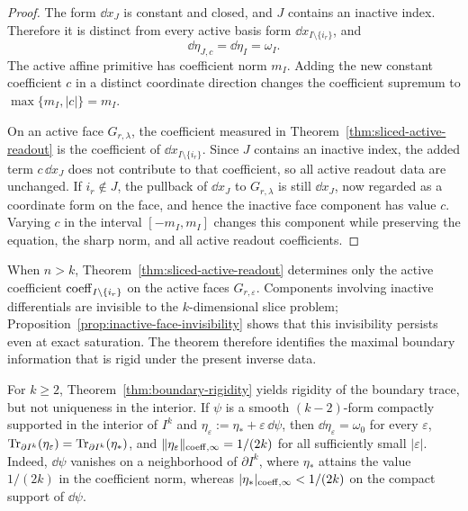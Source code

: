 \begin{proof}
The form $\dd x_J$ is constant and closed, and $J$ contains an inactive index.
Therefore it is distinct from every active basis form
$\dd x_{I\setminus\{i_r\}}$, and
\[
\dd\eta_{J,c}=\dd\eta_I=\omega_I .
\]
The active affine primitive has coefficient norm $m_I$. Adding the new constant
coefficient $c$ in a distinct coordinate direction changes the coefficient
supremum to $\max\{m_I,|c|\}=m_I$.

On an active face $G_{r,\lambda}$, the coefficient measured in
Theorem~\ref{thm:sliced-active-readout} is the coefficient of
$\dd x_{I\setminus\{i_r\}}$. Since $J$ contains an inactive index, the added
term $c\,\dd x_J$ does not contribute to that coefficient, so all active
readout data are unchanged. If $i_r\notin J$, the pullback of $\dd x_J$ to
$G_{r,\lambda}$ is still $\dd x_J$, now regarded as a coordinate form on the
face, and hence the inactive face component has value $c$. Varying $c$ in the
interval $[-m_I,m_I]$ changes this component while preserving the equation,
the sharp norm, and all active readout coefficients.
\end{proof}

\begin{remark}
When $n>k$, Theorem~\ref{thm:sliced-active-readout} determines only the active
coefficient $\mathrm{coeff}_{I\setminus\{i_r\}}$ on the active faces
$G_{r,\varepsilon}$. Components involving inactive differentials are invisible
to the $k$-dimensional slice problem; Proposition~\ref{prop:inactive-face-invisibility}
shows that this invisibility persists even at exact saturation. The theorem
therefore identifies the maximal boundary information that is rigid under the
present inverse data.
\end{remark}

\begin{remark}
For $k\ge 2$, Theorem~\ref{thm:boundary-rigidity} yields rigidity of the
boundary trace, but not uniqueness in the interior. If
$\psi$ is a smooth $(k-2)$-form compactly supported in the interior of $I^k$
and $\eta_\varepsilon:=\eta_\ast+\varepsilon\,\dd\psi$, then
$\dd\eta_\varepsilon=\omega_0$ for every $\varepsilon$,
$\operatorname{Tr}_{\partial I^k}(\eta_\varepsilon)=\operatorname{Tr}_{\partial I^k}(\eta_\ast)$, and
$\lVert \eta_\varepsilon \rVert_{\mathrm{coeff},\infty}=1/(2k)$ for all sufficiently small
$|\varepsilon|$. Indeed, $\dd\psi$ vanishes on a neighborhood of
$\partial I^k$, where $\eta_\ast$ attains the value $1/(2k)$ in the
coefficient norm, whereas $\lvert \eta_\ast \rvert_{\mathrm{coeff},\infty}<1/(2k)$ on the
compact support of $\dd\psi$.
\end{remark}

